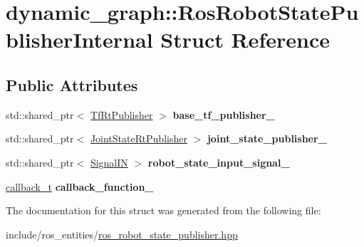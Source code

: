 \hypertarget{structdynamic__graph_1_1RosRobotStatePublisherInternal}{}\section{dynamic\+\_\+graph\+:\+:Ros\+Robot\+State\+Publisher\+Internal Struct Reference}
\label{structdynamic__graph_1_1RosRobotStatePublisherInternal}
\subsection*{Public Attributes}
\begin{DoxyCompactItemize}
\item 
std\+::shared\+\_\+ptr$<$ \hyperlink{namespacedynamic__graph_ac8d567b9a3d1ab846ba2efdc1ff1e120}{Tf\+Rt\+Publisher} $>$ {\bfseries base\+\_\+tf\+\_\+publisher\+\_\+}\hypertarget{structdynamic__graph_1_1RosRobotStatePublisherInternal_a99b630f10c0d338da1da2945f7c7f906}{}\label{structdynamic__graph_1_1RosRobotStatePublisherInternal_a99b630f10c0d338da1da2945f7c7f906}

\item 
std\+::shared\+\_\+ptr$<$ \hyperlink{namespacedynamic__graph_ae9ad83c8174a9aa5bc1688df02b4ee95}{Joint\+State\+Rt\+Publisher} $>$ {\bfseries joint\+\_\+state\+\_\+publisher\+\_\+}\hypertarget{structdynamic__graph_1_1RosRobotStatePublisherInternal_ac04f31a05e4c55eb8f28351af8f9cbf6}{}\label{structdynamic__graph_1_1RosRobotStatePublisherInternal_ac04f31a05e4c55eb8f28351af8f9cbf6}

\item 
std\+::shared\+\_\+ptr$<$ \hyperlink{namespacedynamic__graph_ae1463c695a6915ea3f9ab4311beb527a}{Signal\+IN} $>$ {\bfseries robot\+\_\+state\+\_\+input\+\_\+signal\+\_\+}\hypertarget{structdynamic__graph_1_1RosRobotStatePublisherInternal_aacbcfcb6f326e672f555468111af7d56}{}\label{structdynamic__graph_1_1RosRobotStatePublisherInternal_aacbcfcb6f326e672f555468111af7d56}

\item 
\hyperlink{namespacedynamic__graph_adf7d40f2a8d1425af80c14f90e58e961}{callback\+\_\+t} {\bfseries callback\+\_\+function\+\_\+}\hypertarget{structdynamic__graph_1_1RosRobotStatePublisherInternal_a2aa4d44e955ec44e762deb1059b3e3f7}{}\label{structdynamic__graph_1_1RosRobotStatePublisherInternal_a2aa4d44e955ec44e762deb1059b3e3f7}

\end{DoxyCompactItemize}


The documentation for this struct was generated from the following file\+:\begin{DoxyCompactItemize}
\item 
include/ros\+\_\+entities/\hyperlink{ros__robot__state__publisher_8hpp}{ros\+\_\+robot\+\_\+state\+\_\+publisher.\+hpp}\end{DoxyCompactItemize}
